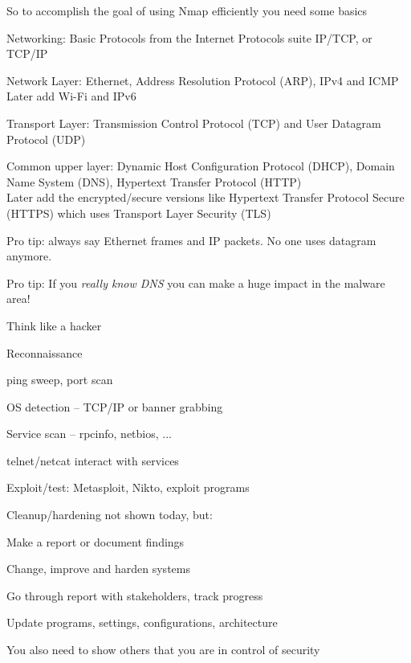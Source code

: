 \documentclass[Screen16to9,17pt]{foils}
\begin{document}





So to accomplish the goal of using Nmap efficiently you need some basics

Networking: Basic Protocols from the Internet Protocols suite IP/TCP, or TCP/IP
\begin{list2}
\item Network Layer: Ethernet, Address Resolution Protocol (ARP), IPv4 and ICMP\\
Later add Wi-Fi and IPv6
\item Transport Layer: Transmission Control Protocol (TCP) and User Datagram Protocol (UDP)
\item Common upper layer: Dynamic Host Configuration Protocol (DHCP), Domain Name System (DNS),
Hypertext Transfer Protocol (HTTP)\\
Later add the encrypted/secure versions like Hypertext Transfer Protocol Secure (HTTPS) which uses Transport Layer Security (TLS)
\end{list2}

Pro tip: always say Ethernet frames and IP packets. No one uses datagram anymore.

Pro tip: If you \emph{really know DNS} you can make a huge impact in the malware area!


\begin{list1}
\item Think like a hacker
\item Reconnaissance
\begin{list2}
\item ping sweep, port scan
\item OS detection -- TCP/IP or banner grabbing
\item Service scan -- rpcinfo, netbios, ...
\item telnet/netcat interact with services
\end{list2}
\item Exploit/test: Metasploit, Nikto, exploit programs
\item Cleanup/hardening not shown today, but:
\begin{list2}
\item Make a report or document findings
\item Change, improve and harden systems
\item Go through report with stakeholders, track progress
\item Update programs, settings, configurations, architecture
\end{list2}
\item You also need to show others that you are in control of security
\end{list1}
\end{document}
